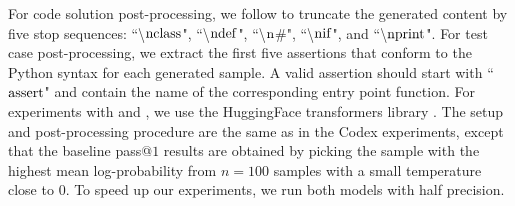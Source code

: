 For code solution post-processing, we follow \cite{chen2021evaluating} to truncate the generated content by five stop sequences: ``\textbackslash${\rm nclass}$", ``\textbackslash${\rm ndef}$", ``\textbackslash ${\rm n}$\#", ``\textbackslash${\rm nif}$", and ``\textbackslash${\rm nprint}$". For test case post-processing, we extract the first five assertions that conform to the Python syntax for each generated sample. A valid assertion should start with ``${\rm assert}$" and contain the name of the corresponding entry point function. For experiments with \incoder and \codegen, we use the HuggingFace transformers library \citep{Wolf2019HuggingFacesTS}. The setup and post-processing procedure are the same as in the Codex experiments, except that the baseline pass@$1$ results are obtained by picking the sample with the highest mean log-probability from $n=100$ samples with a small temperature close to $0$. To speed up our experiments, we run both models with half precision.  
\fi

\begin{table}[t]
    \centering
    \caption{Pass@$k$ ($\%$) on the HumanEval and MBPP benchmarks using \ours and \cushman with different de-duplication settings. The setting ``No No" in the first line means that neither the code solutions nor the test cases are de-duplicated, which is used in our main experiments.}
    \label{tab:deduplication}
\end{table}

